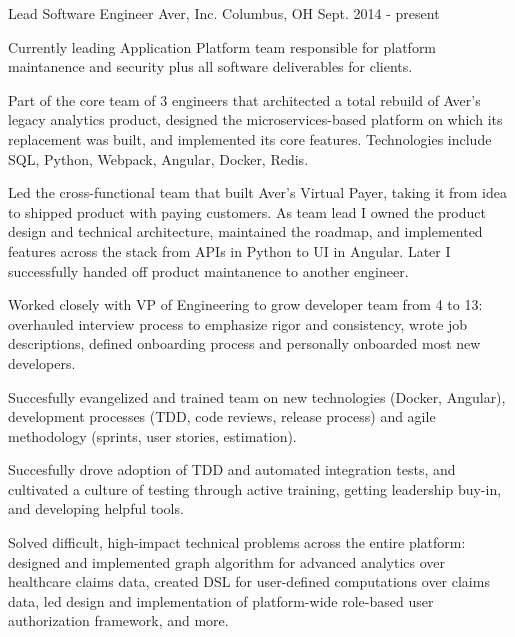 

\begin{cventries}

  \cventry
    {Lead Software Engineer} %
    {Aver, Inc.} %
    {Columbus, OH} %
    {Sept. 2014 - present} %
    {
      \begin{cvitems} %
        \item {Currently leading Application Platform team responsible for platform maintanence and security plus all software deliverables for clients.}
        \item {Part of the core team of 3 engineers that architected a total rebuild of Aver's legacy analytics product, designed the microservices-based platform on which its replacement was built, and implemented its core features. Technologies include SQL, Python, Webpack, Angular, Docker, Redis.}
        \item {Led the cross-functional team that built Aver's Virtual Payer, taking it from idea to shipped product with paying customers. As team lead I owned the product design and technical architecture, maintained the roadmap, and implemented features across the stack from APIs in Python to UI in Angular. Later I successfully handed off product maintanence to another engineer.}
        \item {Worked closely with VP of Engineering to grow developer team from 4 to 13: overhauled interview process to emphasize rigor and consistency, wrote job descriptions, defined onboarding process and personally onboarded most new developers.}
        \item {Succesfully evangelized and trained team on new technologies (Docker, Angular), development processes (TDD, code reviews, release process) and agile methodology (sprints, user stories, estimation). }
        \item {Succesfully drove adoption of TDD and automated integration tests, and cultivated a culture of testing through active training, getting leadership buy-in, and developing helpful tools. }
        \item {Solved difficult, high-impact technical problems across the entire platform: designed and implemented graph algorithm for advanced analytics over healthcare claims data, created DSL for user-defined computations over claims data, led design and implementation of platform-wide role-based user authorization framework, and more.}
      \end{cvitems}
    }


\end{cventries}
